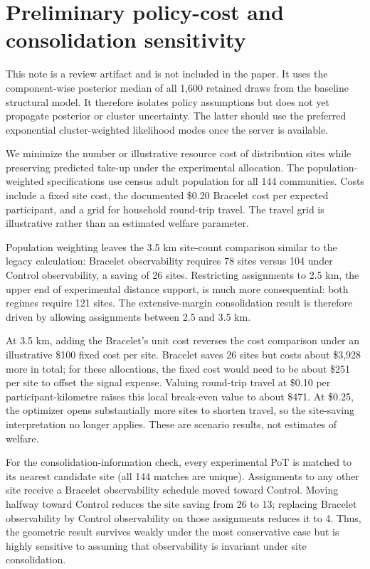 \documentclass[11pt]{article}
\begin{document}
\section*{Preliminary policy-cost and consolidation sensitivity}

This note is a review artifact and is not included in the paper. It uses the
component-wise posterior median of all 1,600 retained draws from the baseline
structural model. It therefore isolates policy assumptions but does not yet
propagate posterior or cluster uncertainty. The latter should use the preferred
exponential cluster-weighted likelihood modes once the server is available.

We minimize the number or illustrative resource cost of distribution sites
while preserving predicted take-up under the experimental allocation. The
population-weighted specifications use census adult population for all 144
communities. Costs include a fixed site cost, the documented \$0.20 Bracelet
cost per expected participant, and a grid for household round-trip travel. The
travel grid is illustrative rather than an estimated welfare parameter.

Population weighting leaves the 3.5 km site-count comparison similar to the
legacy calculation: Bracelet observability requires 78 sites versus 104 under
Control observability, a saving of 26 sites. Restricting assignments to 2.5 km,
the upper end of experimental distance support, is much more consequential:
both regimes require 121 sites. The extensive-margin consolidation result is
therefore driven by allowing assignments between 2.5 and 3.5 km.

At 3.5 km, adding the Bracelet's unit cost reverses the cost comparison under
an illustrative \$100 fixed cost per site. Bracelet saves 26 sites but costs
about \$3,928 more in total; for these allocations, the fixed cost would need
to be about \$251 per site to offset the signal expense. Valuing round-trip
travel at \$0.10 per participant-kilometre raises this local break-even value
to about \$471. At \$0.25, the optimizer opens substantially more sites to
shorten travel, so the site-saving interpretation no longer applies. These are
scenario results, not estimates of welfare.

For the consolidation-information check, every experimental PoT is matched to
its nearest candidate site (all 144 matches are unique). Assignments to any
other site receive a Bracelet observability schedule moved toward Control.
Moving halfway toward Control reduces the site saving from 26 to 13; replacing
Bracelet observability by Control observability on those assignments reduces it
to 4. Thus, the geometric result survives weakly under the most conservative
case but is highly sensitive to assuming that observability is invariant under
site consolidation.
\end{document}
